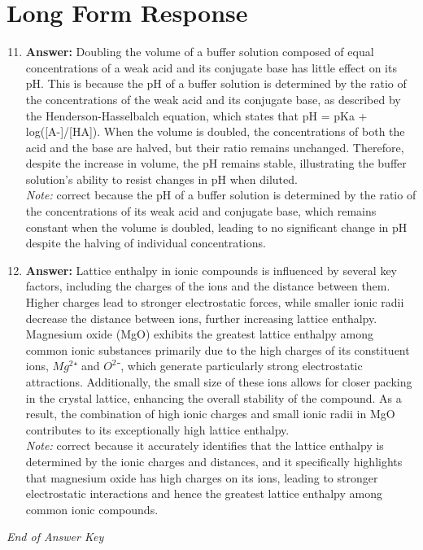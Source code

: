 \documentclass[12pt]{article}
\begin{document}
\section*{Long Form Response}
\begin{enumerate}[label=\arabic*.]
\setcounter{enumi}{10}
\item \textbf{Answer:} Doubling the volume of a buffer solution composed of equal concentrations of a weak acid and its conjugate base has little effect on its pH. This is because the pH of a buffer solution is determined by the ratio of the concentrations of the weak acid and its conjugate base, as described by the Henderson-Hasselbalch equation, which states that pH = pKa + log([A-]/[HA]). When the volume is doubled, the concentrations of both the acid and the base are halved, but their ratio remains unchanged. Therefore, despite the increase in volume, the pH remains stable, illustrating the buffer solution's ability to resist changes in pH when diluted.
\\ \textit{Note:} correct because the pH of a buffer solution is determined by the ratio of the concentrations of its weak acid and conjugate base, which remains constant when the volume is doubled, leading to no significant change in pH despite the halving of individual concentrations.
\item \textbf{Answer:} Lattice enthalpy in ionic compounds is influenced by several key factors, including the charges of the ions and the distance between them. Higher charges lead to stronger electrostatic forces, while smaller ionic radii decrease the distance between ions, further increasing lattice enthalpy. Magnesium oxide (MgO) exhibits the greatest lattice enthalpy among common ionic substances primarily due to the high charges of its constituent ions, $Mg^2$⁺ and $O^2$⁻, which generate particularly strong electrostatic attractions. Additionally, the small size of these ions allows for closer packing in the crystal lattice, enhancing the overall stability of the compound. As a result, the combination of high ionic charges and small ionic radii in MgO contributes to its exceptionally high lattice enthalpy.
\\ \textit{Note:} correct because it accurately identifies that the lattice enthalpy is determined by the ionic charges and distances, and it specifically highlights that magnesium oxide has high charges on its ions, leading to stronger electrostatic interactions and hence the greatest lattice enthalpy among common ionic compounds.
\end{enumerate}

\vfill
\noindent\textit{End of Answer Key}
\end{document}
